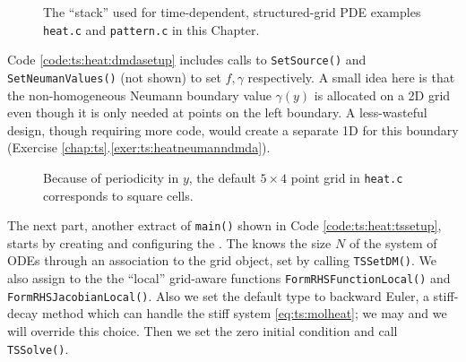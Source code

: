 \begin{figure}
\caption{The \PETSc ``stack'' used for time-dependent, structured-grid PDE examples \texttt{heat.c} and \texttt{pattern.c} in this Chapter.}
\label{fig:ts:stack}
\end{figure}


Code \ref{code:ts:heat:dmdasetup} includes calls to \texttt{SetSource()} and \texttt{SetNeumanValues()} (not shown) to set $f,\gamma$ respectively.  A small idea here is that the non-homogeneous Neumann boundary value $\gamma(y)$ is allocated on a 2D grid even though it is only needed at points on the left boundary.  A less-wasteful design, though requiring more code, would create a separate 1D \pDMDA for this boundary (Exercise \ref{chap:ts}.\ref{exer:ts:heatneumanndmda}).

\begin{figure}

\caption{Because of periodicity in $y$, the default $5\times 4$ point grid in \texttt{heat.c} corresponds to square cells.}
\label{fig:ts:heatdefaultgrid}
\end{figure}


The next part, another extract of \texttt{main()} shown in Code \ref{code:ts:heat:tssetup}, starts by creating and configuring the \pTS.  The \pTS knows the size $N$ of the system of ODEs through an association to the \pDMDA grid object, set by calling \texttt{TSSetDM()}.  We also assign to the \pDMDA the ``local'' grid-aware functions \texttt{FormRHSFunctionLocal()} and \texttt{FormRHSJacobianLocal()}.  Also we set the default \pTS type to backward Euler, a stiff-decay method which can handle the stiff system \eqref{eq:ts:molheat}; we may and we will override this choice.  Then we set the zero initial condition and call \texttt{TSSolve()}.


